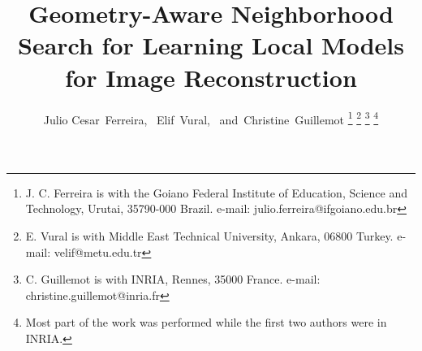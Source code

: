 \documentclass[journal]{IEEEtran}
\begin{document}
%
\title{Geometry-Aware Neighborhood Search for Learning Local Models for Image Reconstruction}
%
%
%

\author{Julio Cesar~Ferreira,~%
        Elif~Vural,~%
        and~Christine~Guillemot%
\thanks{J. C. Ferreira is with the Goiano Federal Institute of Education, Science and Technology, Urutai, 35790-000 Brazil. e-mail: julio.ferreira@ifgoiano.edu.br}%
\thanks{E. Vural is with Middle East Technical University, Ankara, 06800 Turkey. e-mail: velif@metu.edu.tr}
\thanks{C. Guillemot is with INRIA, Rennes, 35000 France. e-mail:  christine.guillemot@inria.fr}
\thanks{Most part of the work was performed while the first two authors were in INRIA.}}

% 
%
\end{document}

